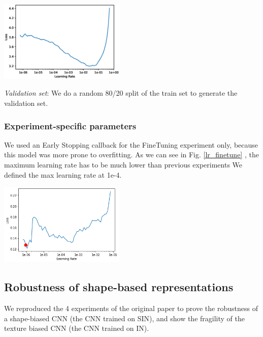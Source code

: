 \documentclass{article}
\begin{document}
\begin{center}
  \captionsetup{type=figure}
  \includegraphics[width = 0.45\textwidth]{imgs/lr_find.eps}
  \label{lr_finder}
\end{center}

\textit{Validation set}: We do a random 80/20 split of the train set to generate the 
validation set.

\subsubsection{Experiment-specific parameters}
We used an Early Stopping callback for the FineTuning experiment only, because this model was more prone to overfitting.
As we can see in Fig. \ref{lr_finetune} , the maximum learning rate has to be much lower than previous experiments 
We defined the max learning rate at 1e-4.

\begin{center}
  \captionsetup{type=figure}
  \includegraphics[width = 0.45\textwidth]{imgs/lr_finetune.png}
  \label{lr_finetune}
\end{center}


\subsection{Robustness of shape-based representations}

We reproduced the 4 experiments of the original paper to prove the robustness of a shape-biased CNN
(the CNN trained on SIN),
and show the fragility of the texture biased CNN (the CNN trained on IN). 
\end{document}

